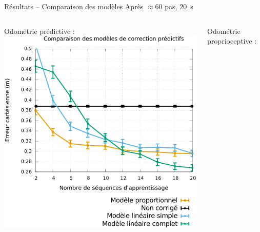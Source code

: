 \begin{frame}{Résultats -- Comparaison des modèles}
    Après $\approx60$ pas, $20$~s\\
    \vspace{1.0em}
    \begin{columns}
        \begin{column}{0.5\linewidth}
            Odométrie prédictive :\\
            \vspace{1.0em}
            \centering
            \includegraphics[type=pdf,ext=.pdf,read=.pdf,width=1.0\linewidth]{../plot/OdometryCMAES/convergenceOrders}
        \end{column}
        \begin{column}{0.5\linewidth}
            Odométrie proprioceptive :\\
            \vspace{1.0em}
            \centering

\end{column}
\end{columns}
\end{frame}
